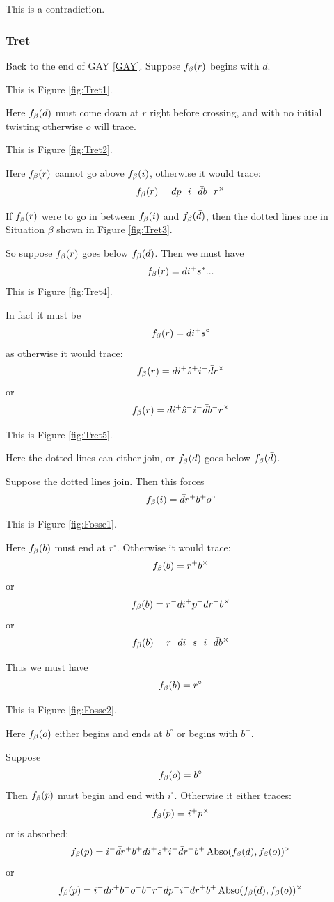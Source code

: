 This is a contradiction.

\subsubsection{Tret}\label{Tret}
Back to the end of GAY \ref{GAY}. Suppose $f_\beta(r)$ begins with $d$.

This is Figure \ref{fig:Tret1}.

Here $f_\beta(d)$ must come down at $r$ right before crossing, and with no initial twisting otherwise $o$ will trace.

This is Figure \ref{fig:Tret2}.

Here $f_\beta(r)$ cannot go above $f_\beta(i)$, otherwise it would trace:
\[
f_\beta(r) = d p^- i^- \bar{d} b^- r^\times
\]

If $f_\beta(r)$ were to go in between $f_\beta(i)$ and $f_\beta(\bar{d})$, then the dotted lines are in Situation $\beta$ shown in Figure \ref{fig:Tret3}.

So suppose $f_\beta(r)$ goes below $f_\beta(\bar{d})$. Then we must have
\[
f_\beta(r) = d i^+ s^*...
\]
This is Figure \ref{fig:Tret4}.

In fact it must be
\[
f_\beta(r) = d i^+ s^\circ
\]
as otherwise it would trace:
\[
f_\beta(r) = d i^+ \hat{s}^+ i^- \bar{d} r^\times
\]
or
\[
f_\beta(r) = d i^+ \hat{s}^- i^- \bar{d} b^- r^\times
\]

This is Figure \ref{fig:Tret5}.

Here the dotted lines can either join, or $f_\beta(d)$ goes below $f_\beta(\bar{d})$.

\label{Fosse}
Suppose the dotted lines join. Then this forces
\[
f_\beta(i) = \bar{d} r^+ b^+ o^\circ
\]

This is Figure \ref{fig:Fosse1}.

Here $f_\beta(b)$ must end at $r^\circ$. Otherwise it would trace:
\[
f_\beta(b) = r^+ b^\times
\]
or
\[
f_\beta(b) = r^- d i^+ p^+ \bar{d} r^+ b^\times
\]
or
\[
f_\beta(b) = r^- d i^+ s^- i^- \bar{d} b^\times
\]

Thus we must have
\[
f_\beta(b) = r^\circ
\]

This is Figure \ref{fig:Fosse2}.

Here $f_\beta(o)$ either begins and ends at $b^\circ$ or begins with $b^-$.

\label{Lacuna}
Suppose
\[
f_\beta(o) = b^\circ
\]
Then $f_\beta(p)$ must begin and end with $i^\circ$. Otherwise it either traces:
\[
f_\beta(p) = i^+ p^\times
\]
or is absorbed:
\[
f_\beta(p) = i^- \bar{d} r^+ b^+ d i^+ s^+ i^- \bar{d} r^+ b^+ \operatorname{Abso}(f_\beta(d), f_\beta(o))^\times
\]
or
\[
f_\beta(p) = i^- \bar{d} r^+ b^+ o^- b^- r^- d p^- i^- \bar{d} r^+ b^+ \operatorname{Abso}(f_\beta(d), f_\beta(o))^\times
\]

